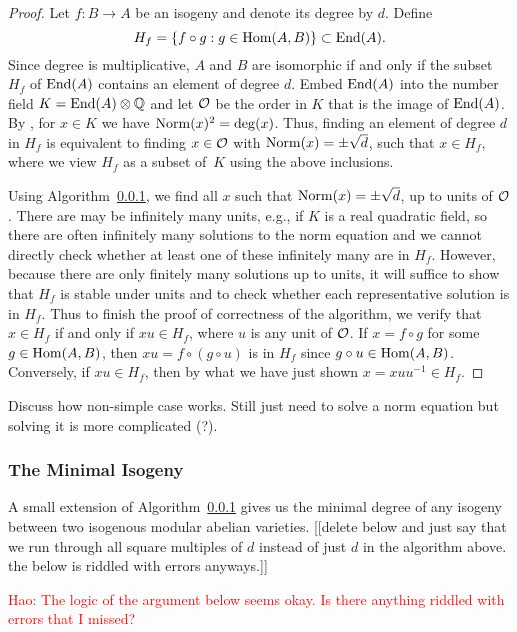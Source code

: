 \documentclass{article}
\newcommand{\Haonew}[1]{\textcolor{red}{\textsf{Hao: #1}}}
\begin{document}
\begin{proof}
  Let $f:B \to A$ be an isogeny and denote its degree by $d$. Define
  $$H_f = \{f \circ g: g \in \operatorname{Hom}(A,B)\} \subset \operatorname{End}(A).$$
  Since
  degree is multiplicative, $A$ and $B$ are isomorphic if and only if
  the subset $H_f$ of $\operatorname{End}(A)$ contains an element of degree $d$. Embed $\operatorname{End}(A)$ into the
  number field $K =
  \operatorname{End}(A) \otimes \mathbb{Q}$ and let $\mathcal{O}$ be the order in $K$ that is the image of
  $\operatorname{End}(A)$. By \cite[Prop~12.12]{milne:abvars}, for
  $x \in K$ we have $\operatorname{Norm}(x)^2 = \deg(x)$. Thus, finding an element
  of degree $d$ in $H_f$ is equivalent to finding $x \in \mathcal{O}$ with
  $\operatorname{Norm}(x) = \pm \sqrt{d}$, such that $x \in H_f$, where we view
$H_f$ as a subset of~$K$ using the above inclusions.

Using Algorithm~\ref{}, we find all $x$ such that $\operatorname{Norm}(x) = \pm
\sqrt{d}$, up to units of $\mathcal{O}$.  There are may be infinitely many
units, e.g., if $K$ is a real quadratic field, so there are often
infinitely many solutions to the norm equation and we cannot directly
check whether at least one of these infinitely many are in $H_f$.
However, because there are only finitely many solutions up to units,
it will suffice to show that $H_f$ is stable under units and to check
whether each representative solution is in $H_f$.  Thus to finish
the proof of correctness of the algorithm, we verify that $x\in H_f$ if
and only if $xu \in H_f$, where $u$ is any unit of $\mathcal{O}$.  If $x = f
\circ g$ for some $g \in \operatorname{Hom}(A,B)$, then $xu = f \circ (g \circ u)$
is in $H_f$ since $g \circ u \in \operatorname{Hom}(A,B)$.  Conversely, if $xu\in
H_f$, then by what we have just shown $x = xuu^{-1} \in H_f$.
\end{proof}

Discuss how non-simple case works.  Still just need to solve a norm
equation but solving it is more complicated (?).

\subsubsection{The Minimal Isogeny}

A small extension of Algorithm~\ref{} gives us the minimal degree of any
isogeny between two isogenous modular abelian varieties.
[[delete below and just say that we run through all square multiples
of $d$ instead of just $d$ in the algorithm above.  the below
is riddled with errors anyways.]]

\Haonew{The logic of the argument below seems okay. Is there anything riddled with errors that I missed?}
\end{document}
